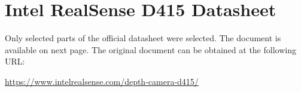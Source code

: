 \chapter{Intel\textregistered{} RealSense\texttrademark{} D415 Datasheet}
\label{ann:d415_datasheet}

Only selected parts of the official datasheet were selected. The document is available on next page. The original document can be obtained at the following URL:

\url{https://www.intelrealsense.com/depth-camera-d415/}


